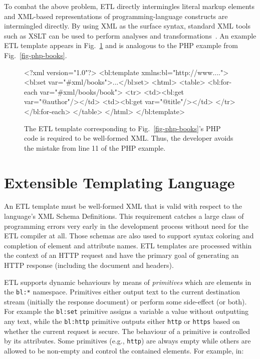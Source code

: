 \documentclass{www2003-submission}
\newcommand{\smtexttt}[1]{{\small\texttt{#1}}}
\newcommand{\ns}[1]{{\small\texttt{#1:*}}}
\newcommand{\figref}[1]{Fig.~\ref{fig-#1}}
\newcommand{\etl}{ETL}
\newenvironment{smalllisting}%
{\renewcommand{\baselinestretch}{1}\small\listing}%
{\renewcommand{\baselinestretch}{2}\endlisting}
\begin{document}
To combat the above problem, ETL directly intermingles literal markup
elements and XML-based representations of programming-language
constructs are intermingled directly.  By using XML as the surface
syntax, standard XML tools such as XSLT  can be used to perform
analyses and transformations~\cite{Badros-www9}.  An example \etl{}
template appears in \figref{etl-books} and is analogous to the PHP
example from
\figref{php-books}.

\begin{figure}[tb]
\begin{smalllisting}{1}
<?xml version="1.0"?>
<bl:template xmlns:bl="http://www....">
 <bl:set var="#xml/books">...</bl:set>
 <html>
  <table>
   <bl:for-each var="#xml/books/book">
    <tr> 
     <td><bl:get var="@author"/></td>
     <td><bl:get var="@title"/></td>
    </tr>
   </bl:for-each>
  </table>
 </html>
</bl:template>
\end{smalllisting}
\caption{The \etl{} template corresponding to \figref{php-books}'s PHP
code is required to be well-formed XML\@.  Thus, the developer
avoids the mistake from line 11 of the PHP example.
\label{fig-etl-books}}
\end{figure}

\section{\hspace*{-.1in}Extensible Templating Language}
\label{sec-etl}

An \etl{} template must be well-formed XML that is valid with respect
to the language's XML Schema Definitions.  This requirement catches a
large class of programming errors very early in the development
process without need for the \etl{} compiler at all.  Those schemas
are also used to support syntax coloring and completion of element and
attribute names.  \etl{} templates are processed within the context of
an HTTP request and have the primary goal of generating an HTTP
response (including the document and headers).

\etl{} supports dynamic behaviours by means of \emph{primitives} which
are elements in the \ns{bl} namespace.  Primitives either output text
to the current destination stream (initially the response document) or
perform some side-effect (or both).  For example the \smtexttt{bl:set}
primitive assigns a variable a value without outputting any text,
while the \smtexttt{bl:http} primitive outputs either \smtexttt{http}
or \smtexttt{https} based on whether the current request is secure.
The behaviour of a primitive is controlled by its attributes.  Some
primitives (e.g., \smtexttt{http}) are always empty while others are
allowed to be non-empty and control the contained elements.
For example, in:
\end{document}

